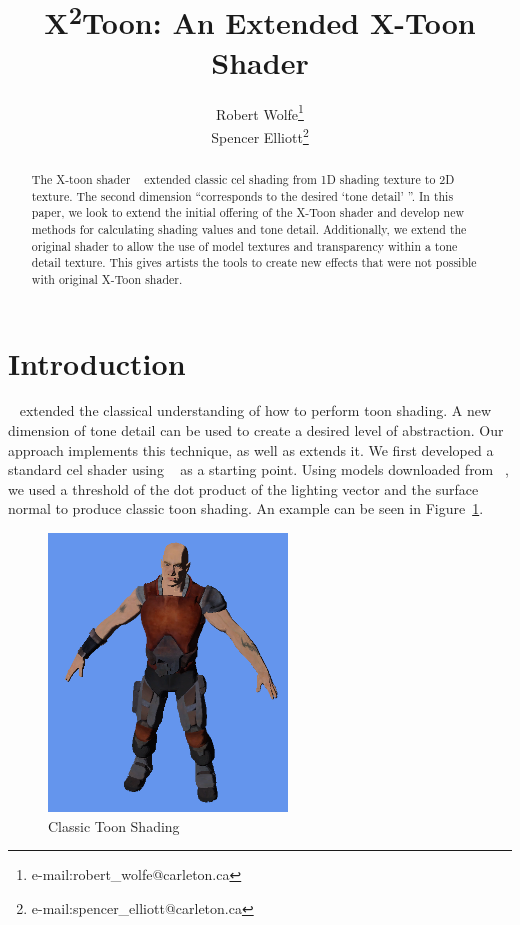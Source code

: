 \documentclass[annual]{acmsiggraph}
\title{X\texorpdfstring{\textsuperscript{2}}-Toon: An Extended X-Toon Shader}
\author{Robert Wolfe\thanks{e-mail:robert\_wolfe@carleton.ca}\\Spencer Elliott\thanks{e-mail:spencer\_elliott@carleton.ca}}
\begin{document}
\maketitle

\begin{abstract}

The X-toon shader ~\cite{BTM06a} extended classic cel shading from 1D shading texture to 2D texture. The second dimension ``corresponds to the desired `tone detail' ''. In this paper, we look to extend the initial offering of the X-Toon shader and develop new methods for calculating shading values and tone detail. Additionally, we extend the original shader to allow the use of model textures and transparency within a tone detail texture. This gives artists the tools to create new effects that were not possible with original X-Toon shader.

\end{abstract}

\keywordlist

\copyrightspace

\section{Introduction}
~\cite{BTM06a} extended the classical understanding of how to perform toon shading. A new dimension of tone detail can be used to create a desired level of abstraction. Our approach implements this technique, as well as extends it. We first developed a standard cel shader using ~\cite{CelShadingTut} as a starting point. Using models downloaded from ~\cite{TurboSquid}, we used a threshold of the dot product of the lighting vector and the surface normal to produce classic toon shading. An example can be seen in Figure~\ref{fig:toonshade}.

\begin{figure}[h]
	\centering
	\includegraphics[width=2.5in]{images/classic_cel2}
	\caption{Classic Toon Shading}
	\label{fig:toonshade}
\end{figure}
\end{document}
